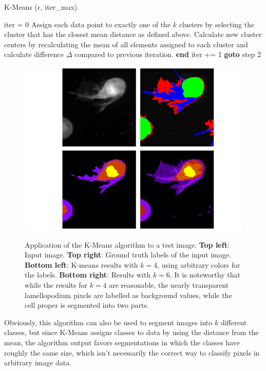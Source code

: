 \begin {algorithm}
	\caption{K-Means ($\epsilon$, iter\_max)}\label{alg:kmeans_pseudo}
	\begin {algorithmic}[1]
		\State iter = 0
		\State Assign each data point to exactly one of the $k$ clusters by selecting the cluster that has the closest mean distance as defined above.
		\State Calculate new cluster centers by recalculating the mean of all elements assigned to each cluster and calculate difference $\Delta$ compared to previous iteration.
			\State \textbf{end}
		\Else
			\State iter += 1
			\State \textbf{goto} step 2
		\EndIf
	\end{algorithmic}
\end{algorithm}

\begin {figure}[!ht]
	\begin {center}
		\includegraphics[scale=0.65]{img/fig_kmeans}
	\end{center}
	\caption{Application of the K-Means algorithm to a test image. \textbf{Top left}: Input image. \textbf{Top right}: Ground truth labels of the input image. \textbf{Bottom left}: K-means results with $k=4$,  using arbitrary colors for the labels. \textbf{Bottom right}: Results with $k=6$. It is noteworthy that while the results for $k=4$ are reasonable, the nearly transparent lamellopodium pixels are labelled as background values, while the cell proper is segmented into two parts.}
	\label{fig:kmeans}
\end {figure}

\noindent Obviously, this algorithm can also be used to segment images into $k$ different classes, but since K-Means assigns classes to data by using the distance from the mean, the algorithm output favors segmentations in which the classes have roughly the same size, which isn't necessarily the correct way to classify pixels in arbitrary image data.

